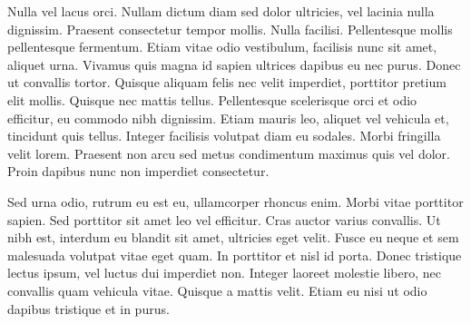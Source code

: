 \documentclass[../00_main.tex]{subfiles}
\begin{document}
Nulla vel lacus orci. Nullam dictum diam sed dolor ultricies, vel lacinia nulla dignissim. Praesent consectetur tempor mollis. Nulla facilisi. Pellentesque mollis pellentesque fermentum. Etiam vitae odio vestibulum, facilisis nunc sit amet, aliquet urna. Vivamus quis magna id sapien ultrices dapibus eu nec purus. Donec ut convallis tortor. Quisque aliquam felis nec velit imperdiet, porttitor pretium elit mollis. Quisque nec mattis tellus. Pellentesque scelerisque orci et odio efficitur, eu commodo nibh dignissim. Etiam mauris leo, aliquet vel vehicula et, tincidunt quis tellus. Integer facilisis volutpat diam eu sodales. Morbi fringilla velit lorem. Praesent non arcu sed metus condimentum maximus quis vel dolor. Proin dapibus nunc non imperdiet consectetur.

Sed urna odio, rutrum eu est eu, ullamcorper rhoncus enim. Morbi vitae porttitor sapien. Sed porttitor sit amet leo vel efficitur. Cras auctor varius convallis. Ut nibh est, interdum eu blandit sit amet, ultricies eget velit. Fusce eu neque et sem malesuada volutpat vitae eget quam. In porttitor et nisl id porta. Donec tristique lectus ipsum, vel luctus dui imperdiet non. Integer laoreet molestie libero, nec convallis quam vehicula vitae. Quisque a mattis velit. Etiam eu nisi ut odio dapibus tristique et in purus.
\end{document}
